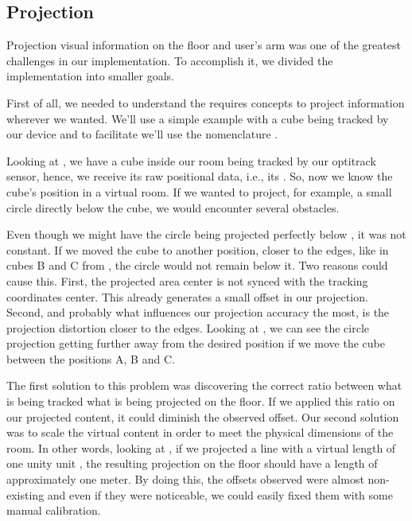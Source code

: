 
\subsection{Projection}
\label{prototype-projection}


Projection visual information on the floor and user's arm was one of the greatest challenges in our implementation. To accomplish it, we divided the implementation into smaller goals.

First of all, we needed to understand the requires concepts to project information wherever we wanted. We'll use a simple example with a cube being tracked by 
our device and to facilitate we'll use the nomenclature .


Looking at , we have a cube inside our room being tracked by our optitrack sensor, hence, we receive its raw positional data, i.e., its .
So, now we know the cube's position in a virtual room. If we wanted to project, for example, a small circle directly below the cube, we would encounter several obstacles.



Even though we might have the circle being projected perfectly below , it was not constant.
If we moved the cube to another position, closer to the edges, like in cubes B and C from , the circle would not remain below it. 
Two reasons could cause this. First, the projected area center is not synced with the tracking coordinates center. 
This already generates a small offset in our projection. 
Second, and probably what influences our projection accuracy the most, is the projection distortion closer to the edges.
Looking at , we can see the circle projection getting further away from the desired position if we move the cube between the positions A, B and C.

The first solution to this problem was discovering the correct ratio between what is being tracked what is being projected on the floor. 
If we applied this ratio on our projected content, it could diminish the observed offset. 
Our second solution was to scale the virtual content in order to meet the physical dimensions of the room. 
In other words, looking at , if we projected a line with a virtual length of one unity unit , the resulting projection on the floor should have a length of approximately one meter.
By doing this, the offsets observed were almost non-existing and even if they were noticeable, we could easily fixed them with some manual calibration.

